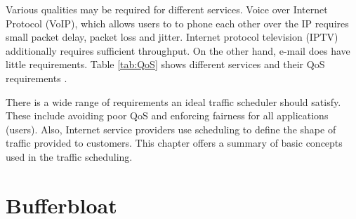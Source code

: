 Various qualities may be required for different services. Voice over Internet Protocol (VoIP), which allows users to to phone each other over the IP requires small packet delay, packet loss and jitter. Internet protocol television (IPTV) additionally requires sufficient throughput. On the other hand, e-mail does have little requirements. Table \ref{tab:QoS} shows different services and their QoS requirements \cite{Tanenbaum:2002:CN:572404}.

\begin{table}
	\caption{Stringency of services’ quality-of-service requirements.}
	
	\label{tab:QoS}
	\centering
\end{table}


There is a wide range of requirements an ideal traffic scheduler should satisfy. These include avoiding poor QoS and enforcing fairness for all applications (users). Also, Internet service providers use scheduling to define the shape of traffic provided to customers. This chapter offers a summary of basic concepts used in the traffic scheduling.

\section{Bufferbloat}
\label{chap:bb}

